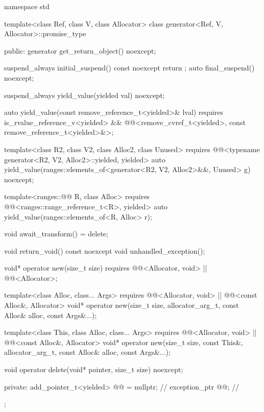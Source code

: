 \begin{codeblock}
namespace std {
  template<class Ref, class V, class Allocator>
  class generator<Ref, V, Allocator>::promise_type {
  public:
    generator get_return_object() noexcept;

    suspend_always initial_suspend() const noexcept { return {}; }
    auto final_suspend() noexcept;

    suspend_always yield_value(yielded val) noexcept;

    auto yield_value(const remove_reference_t<yielded>& lval)
      requires is_rvalue_reference_v<yielded> &&
        @@<remove_cvref_t<yielded>, const remove_reference_t<yielded>&>;

    template<class R2, class V2, class Alloc2, class Unused>
      requires @@<typename generator<R2, V2, Alloc2>::yielded, yielded>
        auto yield_value(ranges::elements_of<generator<R2, V2, Alloc2>&&, Unused> g) noexcept;

    template<ranges::@@ R, class Alloc>
      requires @@<ranges::range_reference_t<R>, yielded>
        auto yield_value(ranges::elements_of<R, Alloc> r);

    void await_transform() = delete;

    void return_void() const noexcept {}
    void unhandled_exception();

    void* operator new(size_t size)
      requires @@<Allocator, void> || @@<Allocator>;

    template<class Alloc, class... Args>
      requires @@<Allocator, void> || @@<const Alloc&, Allocator>
        void* operator new(size_t size, allocator_arg_t, const Alloc& alloc, const Args&...);

    template<class This, class Alloc, class... Args>
      requires @@<Allocator, void> || @@<const Alloc&, Allocator>
        void* operator new(size_t size, const This&, allocator_arg_t, const Alloc& alloc,
                           const Args&...);

    void operator delete(void* pointer, size_t size) noexcept;

  private:
    add_pointer_t<yielded> @@ = nullptr;    // \expos
    exception_ptr @@;                      // \expos
  };
}
\end{codeblock}

